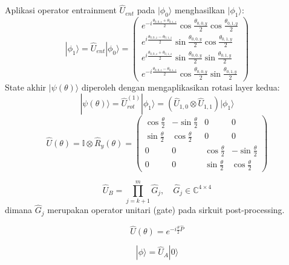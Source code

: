 Aplikasi operator entrainment $\hat{U}_{ent}$ pada $|\phi_0\rangle$ menghasilkan $|\phi_1\rangle$:
\begin{equation}
    |\phi_1\rangle = \hat{U}_{ent}|\phi_0\rangle = \begin{pmatrix} e^{-i\frac{\theta_{0,0,z}+\theta_{0,1,z}}{2}} \cos\frac{\theta_{0,0,y}}{2} \cos\frac{\theta_{0,1,y}}{2} \\ e^{i\frac{\theta_{0,0,z}-\theta_{0,1,z}}{2}} \sin\frac{\theta_{0,0,y}}{2} \cos\frac{\theta_{0,1,y}}{2} \\ e^{i\frac{\theta_{0,0,z}+\theta_{0,1,z}}{2}} \sin\frac{\theta_{0,0,y}}{2} \sin\frac{\theta_{0,1,y}}{2} \\ e^{-i\frac{\theta_{0,0,z}-\theta_{0,1,z}}{2}} \cos\frac{\theta_{0,0,y}}{2} \sin\frac{\theta_{0,1,y}}{2} \end{pmatrix}
\end{equation}
State akhir $|\psi(\theta)\rangle$ diperoleh dengan mengaplikasikan rotasi layer kedua:
\begin{equation}
    |\psi(\theta)\rangle = \hat{U}_{rot}^{(1)}|\phi_1\rangle = (\hat{U}_{1,0} \otimes \hat{U}_{1,1}) |\phi_1\rangle
\end{equation}
\begin{equation}
    \hat{U}(\theta) = \mathbb{I} \otimes \hat{R}_y(\theta) = 
    \begin{pmatrix} 
    \cos\frac{\theta}{2} & -\sin\frac{\theta}{2} & 0 & 0 \\ 
    \sin\frac{\theta}{2} & \cos\frac{\theta}{2} & 0 & 0 \\ 
    0 & 0 & \cos\frac{\theta}{2} & -\sin\frac{\theta}{2} \\ 
    0 & 0 & \sin\frac{\theta}{2} & \cos\frac{\theta}{2} 
    \end{pmatrix}
\end{equation}

\begin{equation}
    \hat{U}_B = \prod_{j=k+1}^{m} \hat{G}_j, \quad \hat{G}_j \in \mathbb{C}^{4 \times 4}
\end{equation}
dimana $\hat{G}_j$ merupakan operator unitari (gate) pada sirkuit post-processing.

\begin{equation}
    \hat{U}(\theta) = e^{-i \frac{\theta}{2} \hat{P}}
\end{equation}

\begin{equation}
    | \phi \rangle = \hat{U}_A | 0 \rangle
\end{equation}

